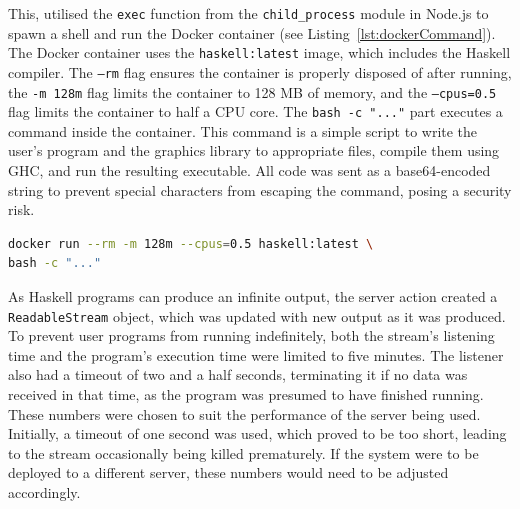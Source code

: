 \documentclass[../main.tex]{subfiles}
\begin{document}
                    This, utilised the \texttt{exec} function from the \texttt{child\_process}
                        module in Node.js to spawn a shell and run the Docker container (see
                        Listing~\ref{lst:dockerCommand}).
                    The Docker container uses the \texttt{haskell:latest} image, which includes the
                        Haskell compiler.
                    The \texttt{--rm} flag ensures the container is properly disposed of after
                        running, the \texttt{-m 128m} flag limits the container to 128 MB of memory,
                        and the \texttt{--cpus=0.5} flag limits the container to half a CPU core.
                    The \verb|bash -c "..."| part executes a command inside the container.
                    This command is a simple script to write the user's program and the graphics
                        library to appropriate files, compile them using GHC, and run the resulting
                        executable.
                    All code was sent as a base64-encoded string to prevent special characters from
                        escaping the command, posing a security risk.

                    \begin{lstlisting}[language={bash}, label={lst:dockerCommand}, caption={The command used to run the 
                        Haskell code in a Docker container. The backslash is used to escape the newline character.}] 
docker run --rm -m 128m --cpus=0.5 haskell:latest \
bash -c "..."\end{lstlisting}

                    As Haskell programs can produce an infinite output, the server action created a
                        \texttt{ReadableStream} object, which was updated with new output as it was
                        produced.
                    To prevent user programs from running indefinitely, both the stream's listening
                        time and the program's execution time were limited to five minutes.
                    The listener also had a timeout of two and a half seconds, terminating it if no
                        data was received in that time, as the program was presumed to have finished
                        running.
                    These numbers were chosen to suit the performance of the server being used.
                    Initially, a timeout of one second was used, which proved to be too short,
                        leading to the stream occasionally being killed prematurely.
                    If the system were to be deployed to a different server, these numbers would
                        need to be adjusted accordingly.
\end{document}

